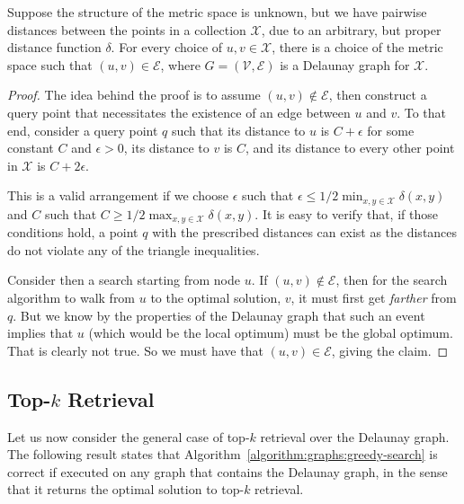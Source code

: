 \begin{theorem}
    Suppose the structure of the metric space is unknown, but we have pairwise distances between
    the points in a collection $\mathcal{X}$, due to an arbitrary, but proper distance function $\delta$.
    For every choice of $u, v \in \mathcal{X}$,
    there is a choice of the metric space such that $(u, v) \in \mathcal{E}$,
    where $G = (\mathcal{V}, \mathcal{E})$ is a Delaunay graph for $\mathcal{X}$.
\end{theorem}
\begin{proof}
    The idea behind the proof is to assume $(u, v) \notin \mathcal{E}$, then
    construct a query point that necessitates the existence of an edge between $u$ and $v$.
    To that end, consider a query point $q$ such that its distance to $u$ is $C + \epsilon$ for some
    constant $C$ and $\epsilon > 0$, its distance to $v$ is $C$, and its distance to 
    every other point in $\mathcal{X}$ is $C + 2 \epsilon$.

    This is a valid arrangement if we choose $\epsilon$ such that
    $\epsilon \leq 1/2 \min_{x, y \in \mathcal{X}} \delta(x, y)$
    and $C$ such that $C \geq 1/2 \max_{x, y \in \mathcal{X}} \delta(x, y)$. It is easy to verify that,
    if those conditions hold, a point $q$ with the prescribed distances can exist as the distances
    do not violate any of the triangle inequalities.

    Consider then a search starting from node $u$. If $(u, v) \notin \mathcal{E}$, then for the search
    algorithm to walk from $u$ to the optimal solution, $v$, it must first get \emph{farther} from $q$.
    But we know by the properties of the Delaunay graph that such an event implies that
    $u$ (which would be the local optimum) must be the global optimum. That is clearly not true.
    So we must have that $(u, v) \in \mathcal{E}$, giving the claim.
\end{proof}

\subsection{Top-\texorpdfstring{$k$}{k} Retrieval}

Let us now consider the general case of top-$k$ retrieval over the Delaunay graph.
The following result states that Algorithm~\ref{algorithm:graphs:greedy-search} is correct
if executed on any graph that contains the Delaunay graph, in the sense that it returns the
optimal solution to top-$k$ retrieval.

